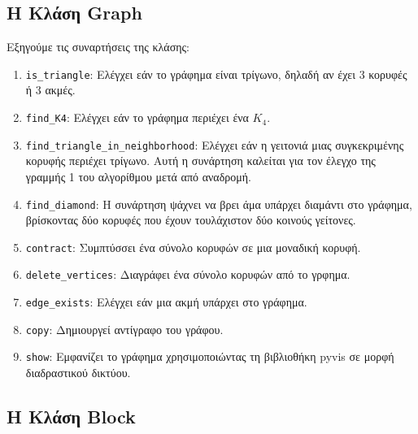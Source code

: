 \subsection{H Kλάση Graph}





Εξηγούμε τις συναρτήσεις της κλάσης:

\begin{enumerate}
	\item \texttt{is\_triangle}: Ελέγχει εάν το γράφημα είναι τρίγωνο, δηλαδή αν έχει 3 κορυφές ή 3 ακμές.
	
	\item \texttt{find\_K4}: Ελέγχει εάν το γράφημα περιέχει ένα $K_4$.
	
	\item \texttt{find\_triangle\_in\_neighborhood}: Ελέγχει εάν η γειτονιά μιας συγκεκριμένης κορυφής περιέχει τρίγωνο. Αυτή η συνάρτηση καλείται για τον έλεγχο της γραμμής 1 του αλγορίθμου μετά από αναδρομή. 
	
	\item \texttt{find\_diamond}: Η συνάρτηση ψάχνει να βρει άμα υπάρχει διαμάντι στο γράφημα, βρίσκοντας δύο κορυφές που έχουν τουλάχιστον δύο κοινούς γείτονες.
	
	\item \texttt{contract}: Συμπτύσσει ένα σύνολο κορυφών σε μια μοναδική κορυφή.
	
	\item \texttt{delete\_vertices}: Διαγράφει ένα σύνολο κορυφών από το γρφημα.
	
	\item \texttt{edge\_exists}: Ελέγχει εάν μια ακμή υπάρχει στο γράφημα.
	
	\item \texttt{copy}: Δημιουργεί αντίγραφο του γράφου.
	
	\item \texttt{show}: Εμφανίζει το γράφημα χρησιμοποιώντας τη βιβλιοθήκη pyvis σε μορφή διαδραστικού δικτύου.
\end{enumerate}


\subsection{H Kλάση Block}


